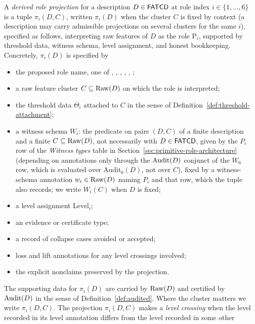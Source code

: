 \begin{definition}\label{def:role-projection}
A \emph{derived role projection} for a description \(D \in \mathsf{FATCD}{}\) at
role index \(i \in \{1,\ldots,6\}\) is a tuple \(\pi_i(D,C)\), written \(\pi_i(D)\) when the cluster \(C\) is fixed
by context (a description may carry admissible projections on several clusters
for the same \(i\)), specified as follows, interpreting raw features of \(D\) as the role \(\mathrm{P}_i\), supported
by threshold data, witness schema, level assignment, and honest bookkeeping.
Concretely, \(\pi_i(D)\) is specified by
\begin{itemize}[topsep=2pt,itemsep=1pt]
  \item the proposed role name, one of \Pone{}, \Ptwo{}, \Pthree{},
    \Pfour{}, \Pfive{}, \Psix{};
  \item a raw feature cluster \(C \subseteq \operatorname{Raw}\!\left(D\right)\) on which the role is
    interpreted;
  \item the threshold data \(\Theta_i\) attached to \(C\) in the sense of
    Definition~\ref{def:threshold-attachment};
  \item a witness schema \(W_i\): the predicate on pairs \((D,C)\) of a finite
    description and a finite \(C\subseteq\operatorname{Raw}\!\left(D\right)\), not necessarily with
    \(D\in\mathsf{FATCD}{}\), given by the \(P_i\) row of the
    \emph{Witness types} table in Section~\ref{sec:primitive-role-architecture}
    (depending on annotations only through the \(\operatorname{Audit}\!\left(D\right)\) conjunct of the
    \(W_6\) row, which is evaluated over \(\mathrm{Audit}_0(D)\), not over \(C\)),
    fixed by a witness-schema annotation \(w_i\in\operatorname{Raw}\!\left(D\right)\) naming \(P_i\) and
    that row, which the tuple also records; we write \(W_i(C)\) when \(D\) is
    fixed;
  \item a level assignment \(\mathrm{Level}_i\);
  \item an evidence or certificate type;
  \item a record of collapse cases avoided or accepted;
  \item loss and lift annotations for any level crossings involved;
  \item the explicit nonclaims preserved by the projection.
\end{itemize}
The supporting data for \(\pi_i(D)\) are carried by
\(\operatorname{Raw}\!\left(D\right)\) and certified by \(\operatorname{Audit}\!\left(D\right)\) in the sense of
Definition~\ref{def:audited}. Where the cluster matters we write
\(\pi_i(D,C)\). The projection \(\pi_i(D,C)\) makes a \emph{level crossing} when the level
recorded in its level annotation differs from the level recorded in some other

\end{definition}
